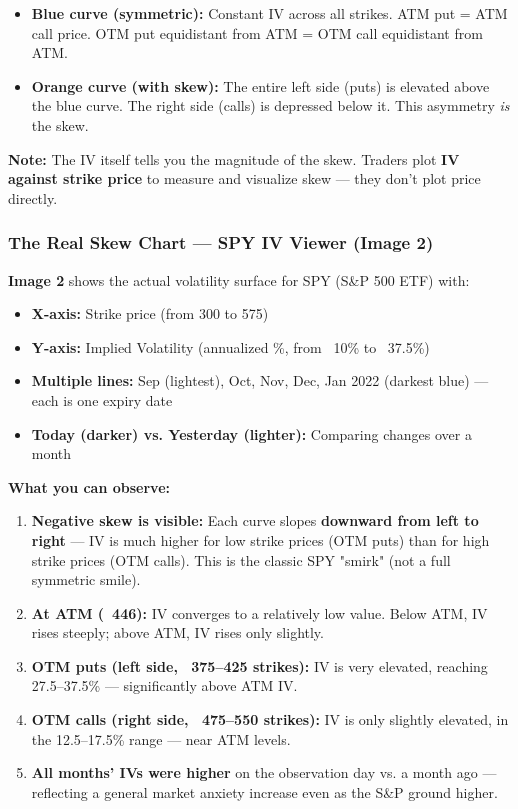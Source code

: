 \documentclass[12pt,openany]{book}
\begin{document}
\begin{itemize}[leftmargin=*]
    \item \textbf{Blue curve (symmetric):} Constant IV across all strikes. ATM put = ATM call price. OTM put equidistant from ATM = OTM call equidistant from ATM.
    \item \textbf{Orange curve (with skew):} The entire left side (puts) is elevated above the blue curve. The right side (calls) is depressed below it. This asymmetry \emph{is} the skew.
\end{itemize}

\textbf{Note:} The IV itself tells you the magnitude of the skew. Traders plot \textbf{IV against strike price} to measure and visualize skew — they don't plot price directly.

\subsubsection{The Real Skew Chart — SPY IV Viewer (Image 2)}

\textbf{Image 2} shows the actual volatility surface for SPY (S\&P 500 ETF) with:
\begin{itemize}[leftmargin=*]
    \item \textbf{X-axis:} Strike price (from 300 to 575)
    \item \textbf{Y-axis:} Implied Volatility (annualized \%, from ~10\% to ~37.5\%)
    \item \textbf{Multiple lines:} Sep (lightest), Oct, Nov, Dec, Jan 2022 (darkest blue) — each is one expiry date
    \item \textbf{Today (darker) vs. Yesterday (lighter):} Comparing changes over a month
\end{itemize}

\textbf{What you can observe:}
\begin{enumerate}[leftmargin=*]
    \item \textbf{Negative skew is visible:} Each curve slopes \textbf{downward from left to right} — IV is much higher for low strike prices (OTM puts) than for high strike prices (OTM calls). This is the classic SPY "smirk" (not a full symmetric smile).
    \item \textbf{At ATM (~446):} IV converges to a relatively low value. Below ATM, IV rises steeply; above ATM, IV rises only slightly.
    \item \textbf{OTM puts (left side, ~375–425 strikes):} IV is very elevated, reaching 27.5–37.5\% — significantly above ATM IV.
    \item \textbf{OTM calls (right side, ~475–550 strikes):} IV is only slightly elevated, in the 12.5–17.5\% range — near ATM levels.
    \item \textbf{All months' IVs were higher} on the observation day vs. a month ago — reflecting a general market anxiety increase even as the S\&P ground higher.
\end{enumerate}
\end{document}
